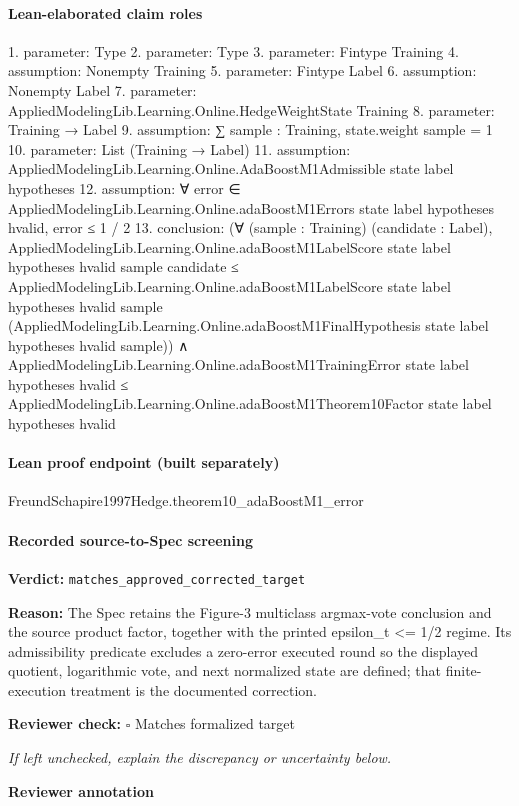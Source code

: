 \documentclass[10pt]{article}
\newcommand{\reviewerbox}{%
  \par\noindent\fbox{\parbox{0.96\linewidth}{\rule{0pt}{0.38in}}}\par
}
\newcommand{\reviewmatch}[1]{%
  \par\noindent\textbf{Reviewer check:} $\square$\; #1\par
  \noindent\emph{If left unchecked, explain the discrepancy or uncertainty below.}\par
}
\begin{document}
\paragraph{Lean-elaborated claim roles}\begin{ReviewVerbatim}
1. parameter: Type
2. parameter: Type
3. parameter: Fintype Training
4. assumption: Nonempty Training
5. parameter: Fintype Label
6. assumption: Nonempty Label
7. parameter: AppliedModelingLib.Learning.Online.HedgeWeightState Training
8. parameter: Training → Label
9. assumption: ∑ sample : Training, state.weight sample = 1
10. parameter: List (Training → Label)
11. assumption: AppliedModelingLib.Learning.Online.AdaBoostM1Admissible state label hypotheses
12. assumption: ∀ error ∈ AppliedModelingLib.Learning.Online.adaBoostM1Errors state label hypotheses hvalid, error ≤ 1 / 2
13. conclusion: (∀ (sample : Training) (candidate : Label),
    AppliedModelingLib.Learning.Online.adaBoostM1LabelScore state label hypotheses hvalid sample candidate ≤
      AppliedModelingLib.Learning.Online.adaBoostM1LabelScore state label hypotheses hvalid sample
        (AppliedModelingLib.Learning.Online.adaBoostM1FinalHypothesis state label hypotheses hvalid sample)) ∧
  AppliedModelingLib.Learning.Online.adaBoostM1TrainingError state label hypotheses hvalid ≤
    AppliedModelingLib.Learning.Online.adaBoostM1Theorem10Factor state label hypotheses hvalid
\end{ReviewVerbatim}

\paragraph{Lean proof endpoint (built separately)}\begin{ReviewVerbatim}
FreundSchapire1997Hedge.theorem10_adaBoostM1_error
\end{ReviewVerbatim}

\paragraph{Recorded source-to-Spec screening}
\textbf{Verdict:} \texttt{matches\_approved\_corrected\_target}
\\
{\raggedright
\textbf{Reason:} The Spec retains the Figure-\allowbreak{}3 multiclass argmax-\allowbreak{}vote conclusion and the source product factor, together with the printed epsilon\_\allowbreak{}t <= 1/\allowbreak{}2 regime.\allowbreak{} Its admissibility predicate excludes a zero-\allowbreak{}error executed round so the displayed quotient, logarithmic vote, and next normalized state are defined;\allowbreak{} that finite-\allowbreak{}execution treatment is the documented correction.\allowbreak{}
\par}
\reviewmatch{Matches formalized target}
\noindent\textbf{Reviewer annotation}\par
\reviewerbox
\clearpage
\hypertarget{source-claim-9fba42664b984349}{}
\end{document}
